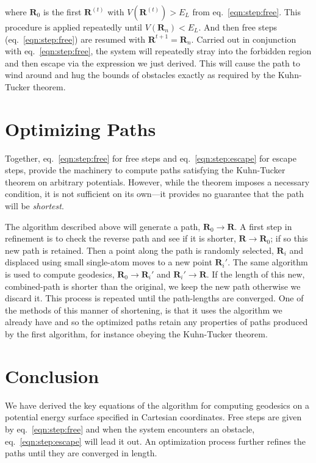 \documentclass[letterpaper]{tufte-handout}
\renewcommand{\refeq}[1]{eq.~\ref{eqn:#1}}
\renewcommand{\vec}[1]{\mathbf{#1}}
\newcommand{\cvec}[1]{\vec{#1}}
\renewcommand{\refeq}[1]{eq.~\ref{eqn:#1}}
\begin{document}
where $\cvec{R}_0$ is the first $\cvec{R}^{(t)}$ with $V\left( \cvec{R}^{(t)} \right) > E_L$ from \refeq{step:free}. This procedure is applied repeatedly until $V(\vec{R}_n) < E_L$. And then free steps (\refeq{step:free}) are resumed with $\vec{R}^{t+1}=\vec{R}_n$. Carried out in conjunction with \refeq{step:free}, the system will repeatedly stray into the forbidden region and then escape via the expression we just derived. This will cause the path to wind around and hug the bounds of obstacles exactly as required by the Kuhn-Tucker theorem.


\section{Optimizing Paths}
Together, \refeq{step:free} for free steps and \refeq{step:escape} for escape steps, provide the machinery to compute paths satisfying the Kuhn-Tucker theorem on arbitrary potentials. However, while the theorem imposes a necessary condition, it is not sufficient on its own---it provides no guarantee that the path will be \emph{shortest}.

The algorithm described above will generate a path, $\vec{R}_0 \to \vec{R}$. A first step in refinement is to check the reverse path and see if it is shorter, $\vec{R} \to \vec{R}_0$; if so this new path is retained. Then a point along the path is randomly selected, $\vec{R}_i$ and displaced using small single-atom moves to a new point $\vec{R}_i'$. The same algorithm is used to compute geodesics, $\vec{R}_0 \to \vec{R}_i'$ and $\vec{R}_i' \to \vec{R}$. If the length of this new, combined-path is shorter than the original, we keep the new path otherwise we discard it. This process is repeated until the path-lengths are converged. One of the methods of this manner of shortening, is that it uses the algorithm we already have and so the optimized paths retain any properties of paths produced by the first algorithm, for instance obeying the Kuhn-Tucker theorem. 

\section{Conclusion}
We have derived the key equations of the algorithm for computing geodesics on a potential energy surface specified in Cartesian coordinates. Free steps are given by \refeq{step:free} and when the system encounters an obstacle, \refeq{step:escape} will lead it out. An optimization process further refines the paths until they are converged in length.



\end{document}
